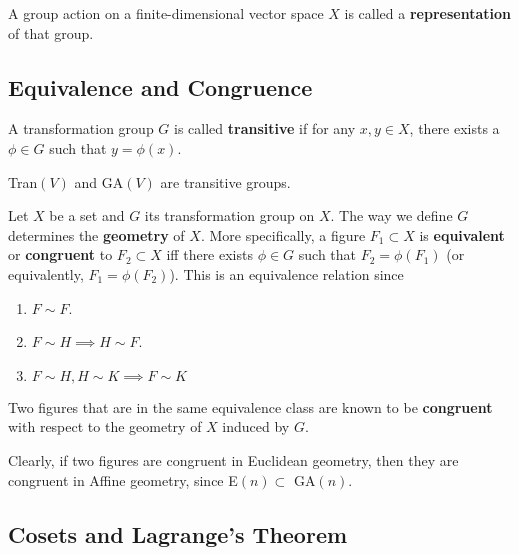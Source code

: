   \begin{definition}
    A group action on a finite-dimensional vector space $X$ is called a \textbf{representation} of that group. 
  \end{definition}

\subsection{Equivalence and Congruence}

  \begin{definition}
    A transformation group $G$ is called \textbf{transitive} if for any $x, y \in X$, there exists a $\phi \in G$ such that $y = \phi(x)$. 
  \end{definition}

  \begin{example}
    Tran$(V)$ and GA$(V)$ are transitive groups. 
  \end{example}

  \begin{definition}
    Let $X$ be a set and $G$ its transformation group on $X$. The way we define $G$ determines the \textbf{geometry} of $X$. More specifically, a figure $F_{1} \subset X$ is \textbf{equivalent} or \textbf{congruent} to $F_{2} \subset X$ iff there exists $\phi \in G$ such that $F_{2} = \phi (F_{1})$ (or equivalently, $F_{1} = \phi (F_{2})$). This is an equivalence relation since
    \begin{enumerate}
      \item $F \sim F$. 
      \item $F \sim H \implies H \sim F$. 
      \item $F \sim H, H \sim K \implies F \sim K$
    \end{enumerate}
    Two figures that are in the same equivalence class are known to be \textbf{congruent} with respect to the geometry of $X$ induced by $G$. 
  \end{definition}

  Clearly, if two figures are congruent in Euclidean geometry, then they are congruent in Affine geometry, since E$(n) \subset$ GA$(n)$. 

\subsection{Cosets and Lagrange's Theorem}

